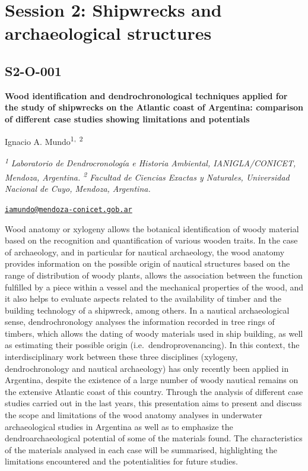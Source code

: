 \documentclass[
]{book}
\begin{document}
\hypertarget{session-2-shipwrecks-and-archaeological-structures}{%
\chapter*{Session 2: Shipwrecks and archaeological structures}\label{session-2-shipwrecks-and-archaeological-structures}}

\hypertarget{s2-o-001}{%
\section*{S2-O-001}\label{s2-o-001}}

\textbf{Wood identification and dendrochronological techniques applied for the study of shipwrecks on the Atlantic coast of Argentina: comparison of different case studies showing limitations and potentials}

Ignacio A. Mundo\textsuperscript{1,~2}

\textsuperscript{\emph{1}} \emph{Laboratorio de Dendrocronología e Historia Ambiental, IANIGLA/CONICET, Mendoza, Argentina. \textsuperscript{2} Facultad de Ciencias Exactas y Naturales, Universidad Nacional de Cuyo, Mendoza, Argentina.}

\href{mailto:iamundo@mendoza-conicet.gob.ar}{\nolinkurl{iamundo@mendoza-conicet.gob.ar}}

Wood anatomy or xylogeny allows the botanical identification of woody material based on the recognition and quantification of various wooden traits. In the case of archaeology, and in particular for nautical archaeology, the wood anatomy provides information on the possible origin of nautical structures based on the range of distribution of woody plants, allows the association between the function fulfilled by a piece within a vessel and the mechanical properties of the wood, and it also helps to evaluate aspects related to the availability of timber and the building technology of a shipwreck, among others. In a nautical archaeological sense, dendrochronology analyses the information recorded in tree rings of timbers, which allows the dating of woody materials used in ship building, as well as estimating their possible origin (i.e.~dendroprovenancing). In this context, the interdisciplinary work between these three disciplines (xylogeny, dendrochronology and nautical archaeology) has only recently been applied in Argentina, despite the existence of a large number of woody nautical remains on the extensive Atlantic coast of this country. Through the analysis of different case studies carried out in the last years, this presentation aims to present and discuss the scope and limitations of the wood anatomy analyses in underwater archaeological studies in Argentina as well as to emphasize the dendroarchaeological potential of some of the materials found. The characteristics of the materials analysed in each case will be summarised, highlighting the limitations encountered and the potentialities for future studies.
\end{document}
